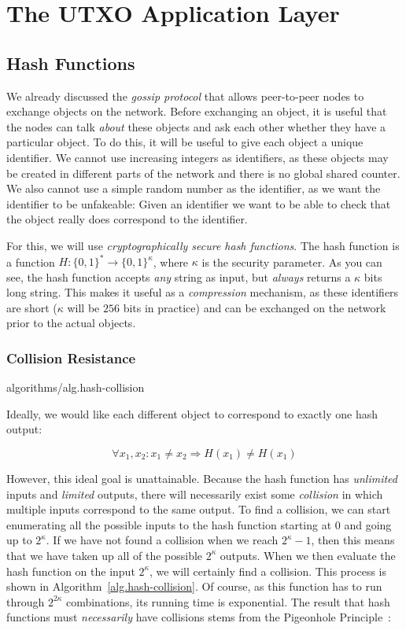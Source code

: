 \chapter{The UTXO Application Layer}

\section{Hash Functions}

We already discussed the \emph{gossip protocol} that allows peer-to-peer nodes to exchange
objects on the network. Before exchanging an object, it is useful that the nodes can talk
\emph{about} these objects and ask each other whether they have a particular object. To
do this, it will be useful to give each object a unique identifier. We cannot use
increasing integers as identifiers, as these objects may be created in different parts of
the network and there is no global shared counter. We also cannot use a simple random
number as the identifier, as we want the identifier to be unfakeable: Given an identifier
we want to be able to check that the object really does correspond to the identifier.

For this, we will use \emph{cryptographically secure hash functions}. The hash function
is a function $H: \{0, 1\}^* \longrightarrow \{0, 1\}^\kappa$, where $\kappa$ is the
security parameter. As you can see, the hash function accepts \emph{any} string as input,
but \emph{always} returns a $\kappa$ bits long string. This makes it useful as a
\emph{compression} mechanism, as these identifiers are short ($\kappa$ will be $256$
bits in practice) and can be exchanged on the network prior to the actual objects.

\subsection*{Collision Resistance}

{algorithms/alg.hash-collision}

Ideally, we would like each different object to correspond to exactly one hash
output:

\[
  \forall x_1, x_2: x_1 \neq x_2 \Rightarrow H(x_1) \neq H(x_1)
\]

However, this ideal goal is unattainable.
Because the hash function has \emph{unlimited} inputs and \emph{limited} outputs,
there will necessarily exist some \emph{collision} in which multiple inputs correspond
to the same output. To find a collision, we can start enumerating all the possible
inputs to the hash function starting at $0$ and going up to $2^\kappa$. If we have
not found a collision when we reach $2^\kappa - 1$, then this means that we have taken
up all of the possible $2^\kappa$ outputs. When we then evaluate the hash function on
the input $2^\kappa$, we will certainly find a collision. This process is shown in
Algorithm~\ref{alg.hash-collision}. Of course, as this function has to run through
$2^{2\kappa}$ combinations, its running time is exponential. The result that hash
functions must \emph{necessarily} have collisions stems from the Pigeonhole
Principle~\cite{liu}:

